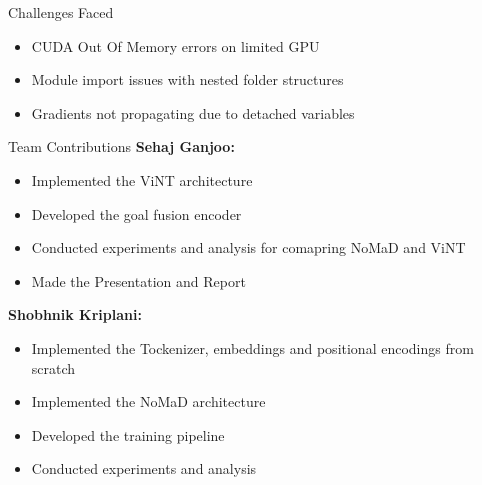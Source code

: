 \documentclass{beamer}
\begin{document}

\begin{frame}{Challenges Faced}
\begin{itemize}
    \item CUDA Out Of Memory errors on limited GPU
    \item Module import issues with nested folder structures
    \item Gradients not propagating due to detached variables
\end{itemize}
\end{frame}

\begin{frame}{Team Contributions}
    \textbf{Sehaj Ganjoo:} \\
    \begin{itemize}
        \item Implemented the ViNT architecture
        \item Developed the goal fusion encoder
        \item Conducted experiments and analysis for comapring NoMaD and ViNT
        \item Made the Presentation and Report
    \end{itemize}
    \textbf{Shobhnik Kriplani:} \\
    \begin{itemize}
        \item Implemented the Tockenizer, embeddings and positional encodings from scratch
        \item Implemented the NoMaD architecture
        \item Developed the training pipeline
        \item Conducted experiments and analysis
    \end{itemize}
\end{frame}
\end{document}
